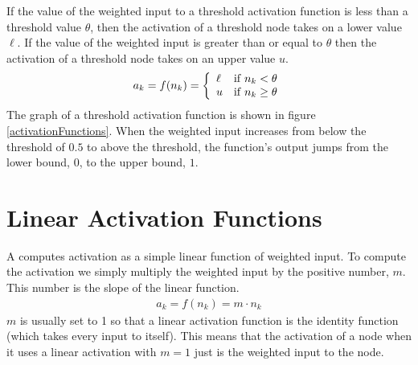    If the value of the weighted input to a threshold activation function is less
than a threshold value $\theta$, then the activation of a threshold
node takes on a lower value $\ell$. If the value of the weighted input is greater
than or equal to $\theta$ then the activation of a threshold node takes on an upper value
$u$.
\begin{eqnarray*}
    a_k = f(n_k) =  \left\{
        \begin{array}{lc}
        \ell & {\rm if} \; n_k < \theta \\
        u  & {\rm if} \;  n_k \geq \theta
    \end{array}
    \right.
\end{eqnarray*}
The graph of a  threshold activation function is shown in figure \ref{activationFunctions}. When the
weighted input increases from below the threshold of $0.5$ to above the threshold,
the function's output jumps from the lower bound, $0$, to the upper bound,
$1$.



\section{Linear Activation Functions}\label{S:linearact}

 A  computes activation as a simple linear function
of weighted input. To compute the activation we simply multiply the weighted input
by the positive number, $m$. This number is the slope of the linear function.
\begin{eqnarray*}
a_k = f(n_k) = m  \cdot n_k
\end{eqnarray*}
$m$ is usually set to 1 so that a linear activation function is the identity function (which takes every input to itself). This means that the activation of a node when it uses a linear activation with $m = 1$ just is the weighted input to the node.

